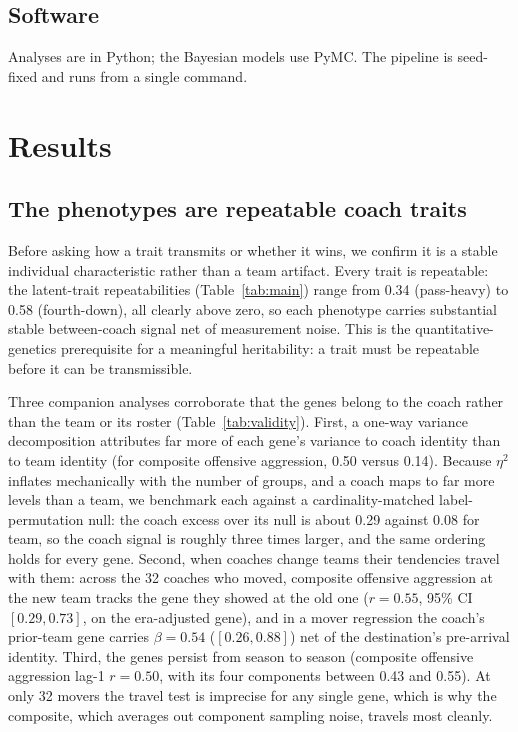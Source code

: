\documentclass[11pt]{article}
\begin{document}
\subsection{Software}
Analyses are in Python; the Bayesian models use PyMC. The pipeline is seed-fixed and
runs from a single command.

\section{Results}

\subsection{The phenotypes are repeatable coach traits}
Before asking how a trait transmits or whether it wins, we confirm it is a stable
individual characteristic rather than a team artifact. Every trait is repeatable:
the latent-trait repeatabilities (Table~\ref{tab:main}) range from 0.34
(pass-heavy) to 0.58 (fourth-down), all clearly above zero, so each phenotype
carries substantial stable between-coach signal net of measurement noise. This is
the quantitative-genetics prerequisite for a meaningful heritability: a trait must
be repeatable before it can be transmissible.

Three companion analyses corroborate that the genes belong to the coach rather than
the team or its roster (Table~\ref{tab:validity}). First, a one-way variance
decomposition attributes far more of each gene's variance to coach identity than to
team identity (for composite offensive aggression, 0.50 versus 0.14). Because
$\eta^2$ inflates mechanically with the number of groups, and a coach maps to far
more levels than a team, we benchmark each against a cardinality-matched
label-permutation null: the coach excess over its null is about 0.29 against 0.08 for
team, so the coach signal is roughly three times larger, and the same ordering holds
for every gene. Second, when coaches change teams their tendencies travel with them:
across the 32 coaches who moved, composite offensive aggression at the new team
tracks the gene they showed at the old one ($r=0.55$, 95\% CI $[0.29,0.73]$, on the
era-adjusted gene), and in a mover regression the coach's prior-team gene carries
$\beta=0.54$ ($[0.26,0.88]$) net of the destination's pre-arrival identity. Third,
the genes persist from season to season (composite offensive aggression lag-1
$r=0.50$, with its four components between 0.43 and 0.55). At only 32 movers the
travel test is imprecise for any single gene, which is why the composite, which
averages out component sampling noise, travels most cleanly.
\end{document}
